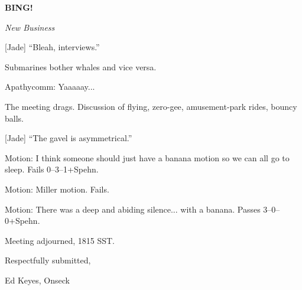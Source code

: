 \documentclass[12pt]{article}
\newcommand{\bing}{{\bf BING!} }
\newcommand{\goto}[1]{\bing \vskip 12pt \centerline{{\em{#1}}}}
\begin{document}
\goto{New Business}

[Jade] ``Bleah, interviews.''

Submarines bother whales and vice versa.

Apathycomm: Yaaaaay...

The meeting drags.  Discussion of flying, zero-gee, amusement-park
rides, bouncy balls.

[Jade] ``The gavel is asymmetrical.''

Motion: I think someone should just have a banana motion so we can
all go to sleep.  Fails 0--3--1+Spehn.

Motion: Miller motion.  Fails.

Motion: There was a deep and abiding silence... with a banana.
Passes 3--0--0+Spehn.

\vspace{12pt}

\noindent
Meeting adjourned, 1815 SST.

\vspace{18pt}

\centerline{Respectfully submitted,}
\centerline{Ed Keyes, Onseck}
\end{document}
